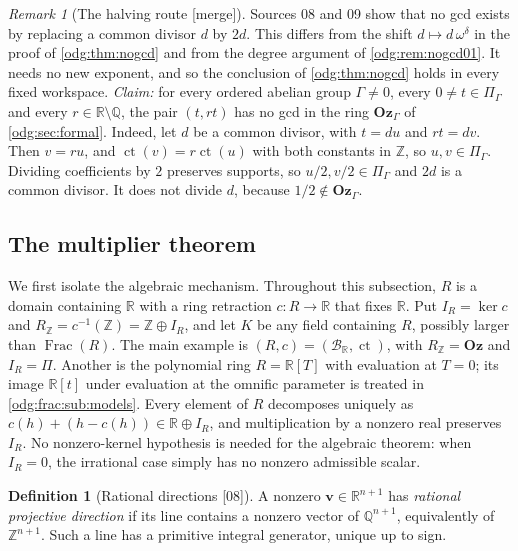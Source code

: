 \documentclass[11pt,oneside]{article}
\numberwithin{equation}{section}
\theoremstyle{definition}
\newtheorem{definition}[definition]{Definition}
\theoremstyle{remark}
\newtheorem{remark}[remark]{Remark}
\newcommand{\Oz}{\mathbf{Oz}}
\newcommand{\Z}{\mathbb Z}
\newcommand{\Q}{\mathbb Q}
\newcommand{\R}{\mathbb R}
\newcommand{\BR}{\mathcal B_{\R}}
\newcommand{\ct}{\operatorname{ct}}
\newcommand{\Frac}{\operatorname{Frac}}
\newcommand{\src}[1]{\textup{\textsf{\small[#1]}}}
\newcommand{\mergetag}{\textup{\textsf{\small[merge]}}}
\begin{document}
\begin{remark}[The halving route \mergetag]\label{odg:frac:rem:halving}
Sources 08 and 09 show that no gcd exists by replacing a common divisor $d$ by
$2d$. This differs from the shift $d\mapsto d\,\omega^\delta$ in the proof of
\cref{odg:thm:nogcd} and from the degree argument of \cref{odg:rem:nogcd01}. It
needs no new exponent, and so the conclusion of \cref{odg:thm:nogcd} holds in
every fixed workspace. \emph{Claim:} for every ordered abelian group
$\Gamma\ne0$, every $0\ne t\in\Pi_\Gamma$ and every $r\in\R\setminus\Q$, the pair
$(t,rt)$ has no gcd in the ring $\Oz_\Gamma$ of \cref{odg:sec:formal}.
Indeed, let $d$ be a common divisor, with $t=du$ and $rt=dv$. Then $v=ru$, and
$\ct(v)=r\ct(u)$ with both constants in $\Z$, so $u,v\in\Pi_\Gamma$. Dividing
coefficients by $2$ preserves supports, so $u/2,v/2\in\Pi_\Gamma$ and $2d$ is a
common divisor. It does not divide $d$, because $1/2\notin\Oz_\Gamma$.
\end{remark}

\subsection{The multiplier theorem}\label{odg:frac:sub:multiplier}

We first isolate the algebraic mechanism. Throughout this subsection, $R$ is a
domain containing $\R$ with a ring retraction $c:R\to\R$ that fixes $\R$. Put
$I_R=\ker c$ and $R_\Z=c^{-1}(\Z)=\Z\oplus I_R$, and let $K$ be any field
containing $R$, possibly larger than $\Frac(R)$. The main example is
$(R,c)=(\BR,\ct)$, with $R_\Z=\Oz$ and $I_R=\Pi$. Another is the polynomial ring $R=\R[T]$ with evaluation at $T=0$;
its image $\R[t]$ under evaluation at the omnific parameter is treated in
\cref{odg:frac:sub:models}. Every element of $R$ decomposes uniquely as
$c(h)+(h-c(h))\in\R\oplus I_R$, and multiplication by a nonzero real
preserves $I_R$. No nonzero-kernel hypothesis is needed for the algebraic
theorem: when $I_R=0$, the irrational case simply has no nonzero
admissible scalar.

\begin{definition}[Rational directions \src{08}]\label{odg:frac:def:rational}
A nonzero $\mathbf v\in\R^{n+1}$ has \emph{rational projective direction} if
its line contains a nonzero vector of $\Q^{n+1}$, equivalently of $\Z^{n+1}$.
Such a line has a primitive integral generator, unique up to sign.
\end{definition}
\end{document}
